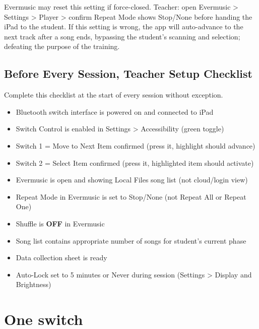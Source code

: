 \documentclass[justified,openright]{tufte-book}
\DeclareRobustCommand{\checkbox}{\(\square\)}
\renewcommand{\chaptermark}[1]{\markboth{#1}{}}
\begin{document}
Evermusic may reset this setting if force-closed. Teacher: open
Evermusic \textgreater{} Settings \textgreater{} Player \textgreater{}
confirm Repeat Mode shows Stop/None before handing the iPad to the
student. If this setting is wrong, the app will auto-advance to the next
track after a song ends, bypassing the student's scanning and selection; defeating the purpose of the training.


\section{Before Every Session, Teacher Setup
Checklist}\label{before-every-session-teacher-setup-checklist}

Complete this checklist at the start of every session without exception.

\begin{itemize}

\item[\checkbox]
Bluetooth switch interface is powered on and connected to iPad
\item[\checkbox] 
Switch Control is enabled in Settings \textgreater{} Accessibility
  (green toggle)
\item[\checkbox]
Switch 1 = Move to Next Item confirmed (press it, highlight should
  advance)
\item[\checkbox] 
Switch 2 = Select Item confirmed (press it, highlighted item should
  activate)
\item[\checkbox] 
Evermusic is open and showing Local Files song list (not cloud/login
  view)
\item[\checkbox] 
Repeat Mode in Evermusic is set to Stop/None (not Repeat All or Repeat
  One)
\item[\checkbox] 
Shuffle is \textbf{OFF} in Evermusic
\item[\checkbox] 
Song list contains appropriate number of songs for student's current
  phase
\item[\checkbox] 
Data collection sheet is ready
\item[\checkbox] 
Auto-Lock set to 5 minutes or Never during session (Settings
  \textgreater{} Display and Brightness)
\end{itemize}

\chapter{One switch}
\label{section-3-prerequisite-stage-cause-effect-with-one-switch}
\chaptermark{One switch}
\end{document}

